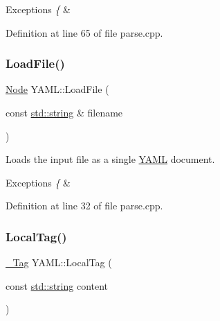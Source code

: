 \begin{DoxyExceptions}{Exceptions}
{\em \{} & \\
\hline
\end{DoxyExceptions}


Definition at line 65 of file parse.\+cpp.

\mbox{\label{namespace_y_a_m_l_a75394f7f2e5ea064ab0fded7bde2677e}} 
\subsubsection{\texorpdfstring{LoadFile()}{LoadFile()}}
{\footnotesize\ttfamily \mbox{\hyperlink{class_y_a_m_l_1_1_node}{Node}} Y\+A\+M\+L\+::\+Load\+File (\begin{DoxyParamCaption}\item[{const \mbox{\hyperlink{glad_8h_ac83513893df92266f79a515488701770}{std\+::string}} \&}]{filename }\end{DoxyParamCaption})}

Loads the input file as a single \mbox{\hyperlink{namespace_y_a_m_l}{Y\+A\+ML}} document.


\begin{DoxyExceptions}{Exceptions}
{\em \{} & \\
\hline
\end{DoxyExceptions}


Definition at line 32 of file parse.\+cpp.

\mbox{\label{namespace_y_a_m_l_a4b116759448ade5321aeb98fd2f2c209}} 
\subsubsection{\texorpdfstring{LocalTag()}{LocalTag()}\hspace{0.1cm}{\footnotesize\ttfamily [1/2]}}
{\footnotesize\ttfamily \mbox{\hyperlink{struct_y_a_m_l_1_1___tag}{\+\_\+\+Tag}} Y\+A\+M\+L\+::\+Local\+Tag (\begin{DoxyParamCaption}\item[{const \mbox{\hyperlink{glad_8h_ac83513893df92266f79a515488701770}{std\+::string}}}]{content }\end{DoxyParamCaption})\hspace{0.3cm}{\ttfamily [inline]}}



